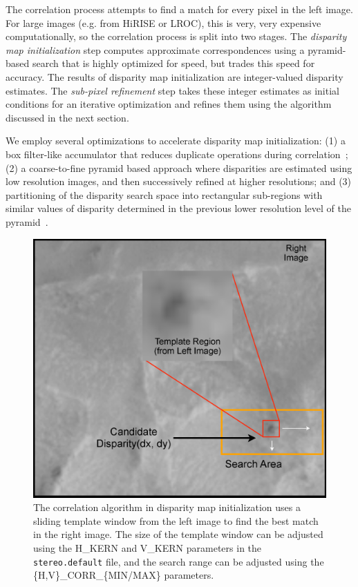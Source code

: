 The correlation process attempts to find a match for every pixel in
the left image.  For large images (e.g. from HiRISE or LROC), this is
very, very expensive computationally, so the correlation process is
split into two stages.  The {\em disparity map initialization} step
computes approximate correspondences using a pyramid-based search that
is highly optimized for speed, but trades this speed for accuracy.
The results of disparity map initialization are integer-valued
disparity estimates.  The {\em sub-pixel refinement} step takes these
integer estimates as initial conditions for an iterative optimization
and refines them using the algorithm discussed in the next section.

We employ several optimizations to accelerate disparity map
initialization: (1) a box filter-like accumulator that reduces
duplicate operations during correlation~\cite{Sun02rectangular}; (2) a
coarse-to-fine pyramid based approach where disparities are estimated
using low resolution images, and then successively refined at higher
resolutions; and (3) partitioning of the disparity search space into
rectangular sub-regions with similar values of disparity determined in
the previous lower resolution level of the
pyramid~\cite{Sun02rectangular}.

\begin{figure}[bt]
  \centering
  \includegraphics[width=13cm]{images/correlation/correlation}
  \caption{The correlation algorithm in disparity map initialization
    uses a sliding template window from the left image to find the
    best match in the right image.  The size of the template window
    can be adjusted using the H\_KERN and V\_KERN parameters in the
    {\tt stereo.default} file, and the search range can be adjusted
    using the \{H,V\}\_CORR\_\{MIN/MAX\} parameters.}
  \label{fig:correlation_window}
\end{figure}

